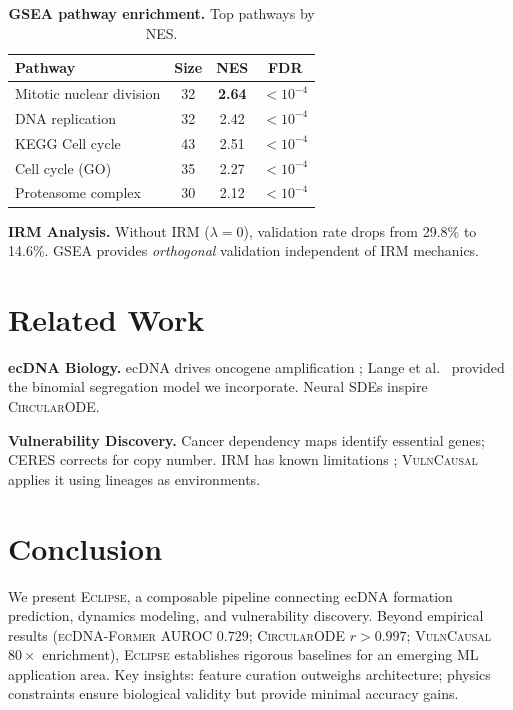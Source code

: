 \documentclass[runningheads]{llncs}
\newcommand{\eclipse}{\textsc{Eclipse}}
\newcommand{\former}{\textsc{ecDNA-Former}}
\newcommand{\circularode}{\textsc{CircularODE}}
\newcommand{\vulncausal}{\textsc{VulnCausal}}
\begin{document}
\begin{table}[t]
\caption{\textbf{GSEA pathway enrichment.} Top pathways by NES.}
\label{tab:gsea}
\centering
\footnotesize
\begin{tabular}{@{}lccc@{}}
\toprule
Pathway & Size & NES & FDR \\
\midrule
Mitotic nuclear division & 32 & \textbf{2.64} & $<10^{-4}$ \\
DNA replication & 32 & 2.42 & $<10^{-4}$ \\
KEGG Cell cycle & 43 & 2.51 & $<10^{-4}$ \\
Cell cycle (GO) & 35 & 2.27 & $<10^{-4}$ \\
Proteasome complex & 30 & 2.12 & $<10^{-4}$ \\
\bottomrule
\end{tabular}
\end{table}

\textbf{IRM Analysis.} Without IRM ($\lambda = 0$), validation rate drops from 29.8\% to 14.6\%. GSEA provides \textit{orthogonal} validation independent of IRM mechanics.


\section{Related Work}
\label{sec:related}

\textbf{ecDNA Biology.} ecDNA drives oncogene amplification \cite{turner_2017_ecdna, verhaak_2019_ecdna_review}; Lange et al.\ \cite{lange_2022_mathematical} provided the binomial segregation model we incorporate. Neural SDEs \cite{li_2020_neuralsde} inspire \circularode{}.

\textbf{Vulnerability Discovery.} Cancer dependency maps \cite{tsherniak_2017_depmap, behan_2019_prioritization} identify essential genes; CERES \cite{meyers_2017_ceres} corrects for copy number. IRM \cite{arjovsky_2019_irm} has known limitations \cite{rosenfeld_2021_irm_risks}; \vulncausal{} applies it using lineages as environments.


\section{Conclusion}
\label{sec:conclusion}

We present \eclipse{}, a composable pipeline connecting ecDNA formation prediction, dynamics modeling, and vulnerability discovery. Beyond empirical results (\former{} AUROC $0.729$; \circularode{} $r > 0.997$; \vulncausal{} $80\times$ enrichment), \eclipse{} establishes rigorous baselines for an emerging ML application area. Key insights: feature curation outweighs architecture; physics constraints ensure biological validity but provide minimal accuracy gains.
\end{document}
